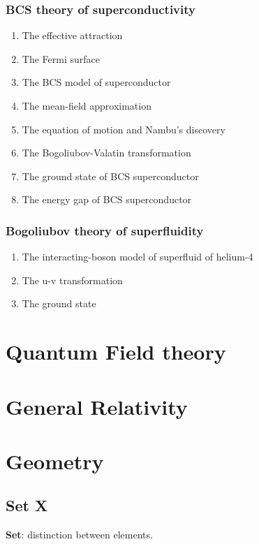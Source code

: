 \documentclass[12pt]{article}
\numberwithin{equation}{section}
\begin{document}
\subsubsection{BCS theory of superconductivity}
\begin{enumerate}
\item The effective attraction
\item The Fermi surface
\item The BCS model of  superconductor
\item The mean-field approximation
\item The equation of motion and Nambu's discovery
\item The Bogoliubov-Valatin transformation
\item The ground state of BCS superconductor
\item The energy gap of BCS superconductor
\end{enumerate}
\subsubsection{Bogoliubov theory of superfluidity}
\begin{enumerate}
\item The interacting-boson model of superfluid of helium-4
\item The u-v transformation
\item The ground state
\end{enumerate}                     
\section{Quantum Field theory}

\section{General Relativity}

\section{Geometry}
\subsection{Set X}
	\textbf{Set}: distinction between elements.
\end{document}
